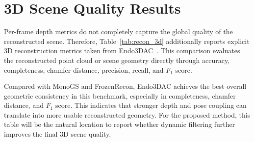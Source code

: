 \section{3D Scene Quality Results}
Per-frame depth metrics do not completely capture the global quality of the reconstructed scene. Therefore, Table~\ref{tab:recon_3d} additionally reports explicit 3D reconstruction metrics taken from Endo3DAC~\cite{endo3dac2025}. This comparison evaluates the reconstructed point cloud or scene geometry directly through accuracy, completeness, chamfer distance, precision, recall, and $F_1$ score.

\begin{table}[htbp]
    \centering
    \caption[3D reconstruction results on SCARED]{Comparison of 3D scene reconstruction results on SCARED, reproduced from Endo3DAC~\cite{endo3dac2025}.}
    \label{tab:recon_3d}
\end{table}

Compared with MonoGS and FrozenRecon, Endo3DAC achieves the best overall geometric consistency in this benchmark, especially in completeness, chamfer distance, and $F_1$ score. This indicates that stronger depth and pose coupling can translate into more usable reconstructed geometry. For the proposed method, this table will be the natural location to report whether dynamic filtering further improves the final 3D scene quality.

